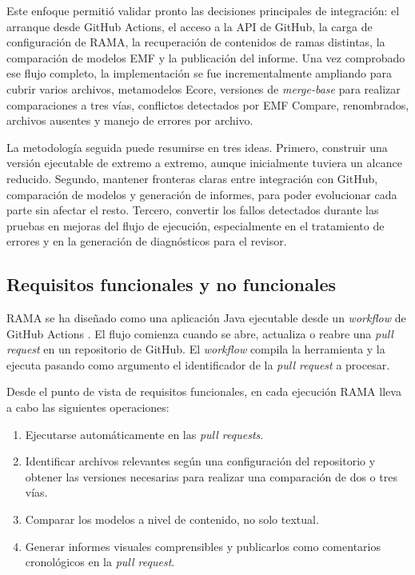 \documentclass[11pt]{article}
\begin{document}
Este enfoque permitió validar pronto las decisiones principales de integración: el arranque desde GitHub Actions, el acceso a la API de GitHub, la carga de configuración de RAMA, la recuperación de contenidos de ramas distintas, la comparación de modelos EMF y la publicación del informe. Una vez comprobado ese flujo completo, la implementación se fue incrementalmente ampliando para cubrir varios archivos, metamodelos Ecore, versiones de \textit{merge-base} para realizar comparaciones a tres vías, conflictos detectados por EMF Compare, renombrados, archivos ausentes y manejo de errores por archivo.

La metodología seguida puede resumirse en tres ideas. Primero, construir una versión ejecutable de extremo a extremo, aunque inicialmente tuviera un alcance reducido. Segundo, mantener fronteras claras entre integración con GitHub, comparación de modelos y generación de informes, para poder evolucionar cada parte sin afectar el resto. Tercero, convertir los fallos detectados durante las pruebas en mejoras del flujo de ejecución, especialmente en el tratamiento de errores y en la generación de diagnósticos para el revisor.

\subsection{Requisitos funcionales y no funcionales}

RAMA se ha diseñado como una aplicación Java ejecutable desde un \textit{workflow} de GitHub Actions \cite{github-actions}. El flujo comienza cuando se abre, actualiza o reabre una \textit{pull request} en un repositorio de GitHub. El \textit{workflow} compila la herramienta y la ejecuta pasando como argumento el identificador de la \textit{pull request} a procesar.

Desde el punto de vista de requisitos funcionales, en cada ejecución RAMA lleva a cabo las siguientes operaciones:

\begin{enumerate}
    \item Ejecutarse automáticamente en las \textit{pull requests}.
    \item Identificar archivos relevantes según una configuración del repositorio y obtener las versiones necesarias para realizar una comparación de dos o tres vías.
    \item Comparar los modelos a nivel de contenido, no solo textual.
    \item Generar informes visuales comprensibles y publicarlos como comentarios cronológicos en la \textit{pull request}.
\end{enumerate}
\end{document}
